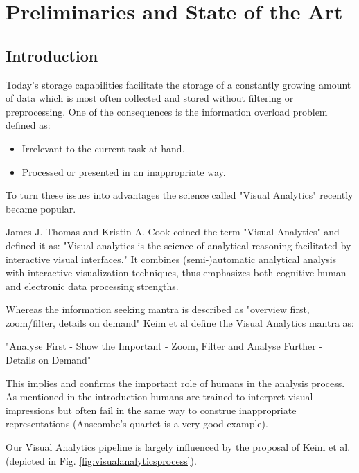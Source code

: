 \section{Preliminaries and State of the Art}\label{sec::relwork} %

\subsection{Introduction}
Today's storage capabilities facilitate the storage of a constantly growing amount of data which is most often collected and stored without filtering or preprocessing.
One of the consequences is the information overload problem defined as:

\begin{itemize}
\item Irrelevant to the current task at hand.
\item Processed or presented in an inappropriate way.
\end{itemize}

To turn these issues into advantages the science called "Visual Analytics" recently became popular. 

James J. Thomas and Kristin A. Cook coined the term "Visual Analytics"\cite{VISUAL_ANALYTICS} and defined it as: "Visual analytics is the science of analytical reasoning facilitated by interactive visual interfaces." It combines (semi-)automatic analytical analysis with interactive visualization techniques, thus emphasizes both cognitive human and electronic data processing strengths.

Whereas the information seeking mantra is described as "overview first, zoom/filter, details on demand" Keim et al define the Visual Analytics mantra as:

"Analyse First -
Show the Important -
Zoom, Filter and Analyse Further -
Details on Demand"\cite{keim2008visual}

This implies and confirms the important role of humans in the analysis process. As mentioned in the introduction humans are trained to interpret visual impressions but often fail in the same way to construe inappropriate representations (Anscombe's quartet is a very good example).

Our Visual Analytics pipeline is largely influenced by the proposal of Keim et al. (depicted in Fig. \ref{fig:visualanalyticsprocess}).

